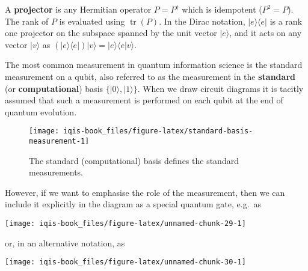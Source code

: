 \documentclass[fleqn]{article}
\newenvironment{idea}{\noindent}{\medskip}
\begin{document}
\begin{idea}
A \textbf{projector} is any Hermitian operator \(P=P^\dagger\) which is idempotent (\(P^2=P\)).
The rank of \(P\) is evaluated using \(\operatorname{tr}(P)\).
In the Dirac notation, \(|e\rangle\langle e|\) is a rank one projector on the subspace spanned by the unit vector \(|e\rangle\), and it acts on any vector \(|v\rangle\) as \((|e\rangle\langle e|)|v\rangle = |e\rangle\langle e|v\rangle\).

\end{idea}

The most common measurement in quantum information science is the standard measurement on a qubit, also referred to as the measurement in the \textbf{standard} (or \textbf{computational}) basis \(\{|0\rangle,|1\rangle\}\).
When we draw circuit diagrams it is tacitly assumed that such a measurement is performed on each qubit at the end of quantum evolution.

\begin{figure}[H]

{\centering \texttt{[image: iqis-book\_files/figure-latex/standard-basis-measurement-1]} 

}

\caption{The standard (computational) basis defines the standard measurements.}\label{fig:standard-basis-measurement}
\end{figure}

However, if we want to emphasise the role of the measurement, then we can include it explicitly in the diagram as a special quantum gate, e.g.~as

\begin{center}\texttt{[image: iqis-book\_files/figure-latex/unnamed-chunk-29-1]} \end{center}

or, in an alternative notation, as

\begin{center}\texttt{[image: iqis-book\_files/figure-latex/unnamed-chunk-30-1]} \end{center}
\end{document}
